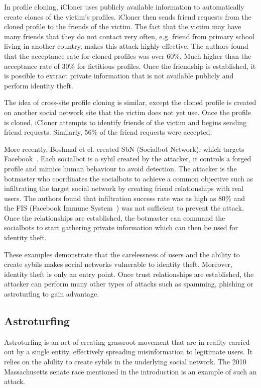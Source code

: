 In profile cloning, iCloner uses publicly available information to automatically
create clones of the victim's profiles. iCloner then sends friend requests from
the cloned profile to the friends of the victim. The fact that the victim may
have many friends that they do not contact very often, e.g. friend from primary
school living in another country, makes this attack highly effective. The
authors found that the acceptance rate for cloned profiles was over 60\%. Much
higher than the acceptance rate of 30\% for fictitious profiles. Once the
friendship is established, it is possible to extract private information that is
not available publicly and perform identity theft.

The idea of cross-site profile cloning is similar, except the cloned profile is
created on another social network site that the victim does not yet use. Once
the profile is cloned, iCloner attempts to identify friends of the
victim and begins sending friend requests. Similarly, 56\% of the friend
requests were accepted. 

More recently, Boshmaf et el. created SbN (Socialbot Network), which targets
Facebook~\cite{boshmaf2011socialbot}. Each socialbot is a sybil created by the
attacker, it controls a forged profile and mimics human behaviour to avoid
detection. The attacker is the botmaster who coordinates the socialbots to
achieve a common objective such as infiltrating the target social network by creating
friend relationships with real users. The authors found that infiltration
success rate was as high as 80\% and the FIS (Facebook Immune
System~\cite{stein2011facebook}) was not sufficient to prevent the attack. Once
the relationships are established, the botmaster can command the socialbots to
start gathering private information which can then be used for identity theft.


These examples demonstrate that the carelessness of users and the ability to
create sybils makes social networks vulnerable to identity theft. Moreover,
identity theft is only an entry point. Once trust relationships are established,
the attacker can perform many other types of attacks such as spamming, phishing
or astroturfing to gain advantage.

\subsection{Astroturfing}
Astroturfing is an act of creating grassroot movement that are in reality
carried out by a single entity, effectively spreading misinformation to
legitimate users. It relies on the ability to create sybils in the underlying
social network. 
The 2010 Massachusetts senate race mentioned in the introduction is an example
of such an attack.

